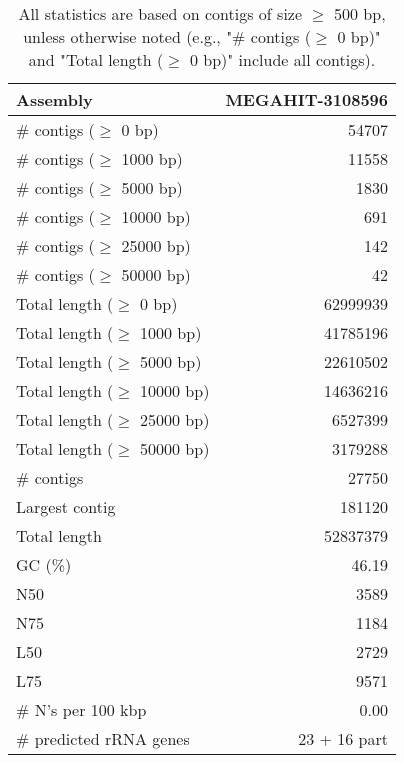 \documentclass[12pt,a4paper]{article}
\begin{document}
\begin{table}[ht]
\begin{center}
\caption{All statistics are based on contigs of size $\geq$ 500 bp, unless otherwise noted (e.g., "\# contigs ($\geq$ 0 bp)" and "Total length ($\geq$ 0 bp)" include all contigs).}
\begin{tabular}{|l*{1}{|r}|}
\hline
Assembly & MEGAHIT-3108596 \\ \hline
\# contigs ($\geq$ 0 bp) & 54707 \\ \hline
\# contigs ($\geq$ 1000 bp) & 11558 \\ \hline
\# contigs ($\geq$ 5000 bp) & 1830 \\ \hline
\# contigs ($\geq$ 10000 bp) & 691 \\ \hline
\# contigs ($\geq$ 25000 bp) & 142 \\ \hline
\# contigs ($\geq$ 50000 bp) & 42 \\ \hline
Total length ($\geq$ 0 bp) & 62999939 \\ \hline
Total length ($\geq$ 1000 bp) & 41785196 \\ \hline
Total length ($\geq$ 5000 bp) & 22610502 \\ \hline
Total length ($\geq$ 10000 bp) & 14636216 \\ \hline
Total length ($\geq$ 25000 bp) & 6527399 \\ \hline
Total length ($\geq$ 50000 bp) & 3179288 \\ \hline
\# contigs & 27750 \\ \hline
Largest contig & 181120 \\ \hline
Total length & 52837379 \\ \hline
GC (\%) & 46.19 \\ \hline
N50 & 3589 \\ \hline
N75 & 1184 \\ \hline
L50 & 2729 \\ \hline
L75 & 9571 \\ \hline
\# N's per 100 kbp & 0.00 \\ \hline
\# predicted rRNA genes & 23 + 16 part \\ \hline
\end{tabular}
\end{center}
\end{table}
\end{document}
